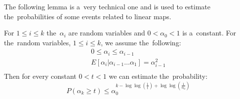 The following lemma is a~very technical one and is used to estimate the~probabilities of some events related to linear maps.
\begin{lemma}
\label{lemma-random-variable}
For $1 \leq i \leq k$ the~$\alpha_i$ are random variables and $0 < \alpha_0 < 1$ is a~constant. For the~random variables, $1 \leq i \leq k$, we assume the~following:
\begin{gather*}
0 \leq \alpha_i \leq \alpha_{i - 1} \\
E[ \alpha_i | \alpha_{i-1} \dots \alpha_1 ] = \alpha_{i-1}^{2} \\
\end{gather*}
Then for every constant $0 < t < 1$ we can estimate the~probability:
\begin{displaymath}
P(\alpha_k \geq t) \leq \alpha_0^{k - \log \log (\frac{1}{t}) + \log \log \left(\frac{1}{\alpha_0}\right)}
\end{displaymath}
\end{lemma}
